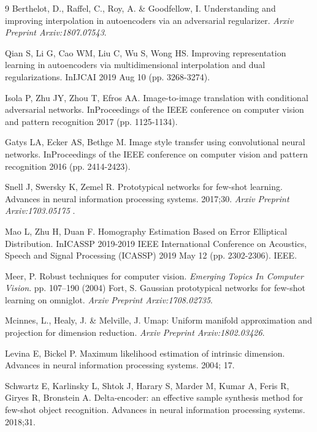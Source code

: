 \documentclass[preprint,12pt,number]{elsarticle}
\begin{document}
\begin{thebibliography}{9}
Berthelot, D., Raffel, C., Roy, A. \& Goodfellow, I. Understanding and improving interpolation in autoencoders via an adversarial regularizer. 
{\em Arxiv Preprint Arxiv:1807.07543}.
  
 
Qian S, Li G, Cao WM, Liu C, Wu S, Wong HS. Improving representation learning in autoencoders via multidimensional interpolation and dual regularizations. InIJCAI 2019 Aug 10 (pp. 3268-3274).

Isola P, Zhu JY, Zhou T, Efros AA. Image-to-image translation with conditional adversarial networks. InProceedings of the IEEE conference on computer vision and pattern recognition 2017 (pp. 1125-1134).

Gatys LA, Ecker AS, Bethge M. Image style transfer using convolutional neural networks. InProceedings of the IEEE conference on computer vision and pattern recognition 2016 (pp. 2414-2423).


Snell J, Swersky K, Zemel R. Prototypical networks for few-shot learning. Advances in neural information processing systems. 2017;30. {\em Arxiv Preprint Arxiv:1703.05175}  .
 
Mao L, Zhu H, Duan F. Homography Estimation Based on Error Elliptical Distribution. InICASSP 2019-2019 IEEE International Conference on Acoustics, Speech and Signal Processing (ICASSP) 2019 May 12 (pp. 2302-2306). IEEE.

Meer, P. Robust techniques for computer vision. 
{\em Emerging Topics In Computer Vision}.
 pp. 107--190 (2004)
Fort, S. Gaussian prototypical networks for few-shot learning on omniglot. 
{\em Arxiv Preprint Arxiv:1708.02735}.
 
Mcinnes, L., Healy, J. \& Melville, J. Umap: Uniform manifold approximation and projection for dimension reduction. 
{\em Arxiv Preprint Arxiv:1802.03426}.

 
Levina E, Bickel P. Maximum likelihood estimation of intrinsic dimension. Advances in neural information processing systems. 2004; 17.

Schwartz E, Karlinsky L, Shtok J, Harary S, Marder M, Kumar A, Feris R, Giryes R, Bronstein A. Delta-encoder: an effective sample synthesis method for few-shot object recognition. Advances in neural information processing systems. 2018;31.
 

\end{thebibliography}
\end{document}
